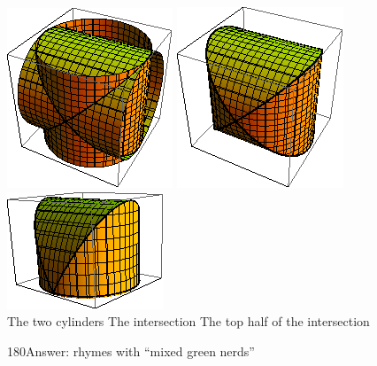 \documentclass[oneside,11pt]{article}
\begin{document}
\begin{enumerate}
\begin{center}
\includegraphics[width=.3\textwidth]{ws6-intersect1.png}
\includegraphics[width=.3\textwidth]{ws6-intersect2.png}
\includegraphics[width=.3\textwidth]{ws6-intersect3.png}\\
\hspace{.2in}The two cylinders\hspace{.85in} The intersection \hfill The top half of the intersection
\end{center}

\vfill 

\hfill \begin{turn}{180}{\footnotesize Answer: rhymes with ``mixed green nerds''}\end{turn}
\end{enumerate}
\end{document}
